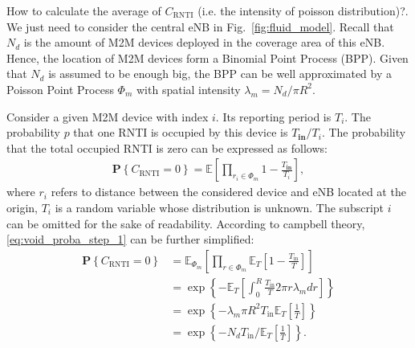 How to calculate the average of $C_{\text{RNTI}}$ (i.e. the intensity of poisson distribution)?. 
We just need to consider the central eNB in Fig.~\ref{fig:fluid_model}. Recall that $N_{d}$ is the amount of M2M devices deployed in the coverage area of this eNB. Hence, the location of M2M devices form a Binomial Point Process (BPP). Given that $N_d$ is assumed to be enough big, the BPP can be well approximated by a Poisson Point Process $\Phi_m$ with spatial intensity $\lambda_m = N_d / \pi R^2$.

Consider a given M2M device with index $i$. Its reporting period is $T_i$. The probability $p$ that one RNTI is occupied by this device is $T_{\textbf{in}}/T_i$. The probability that the total occupied RNTI is zero can be expressed as follows:
\begin{align}
	\label{eq:void_proba_step_1}
	\mathbf{P} \left\lbrace  C_{\text{RNTI}} = 0 \right\rbrace  = \mathbb{E} \left[ \prod_{r_i \in \Phi_m}^{} 1 -  \frac{T_{\textbf{in}}}{T_i} \right] ,
\end{align}
where $r_i$ refers to distance between the considered device and eNB located at the origin, $T_i$ is a random variable whose distribution is unknown. The subscript $i$ can be omitted for the sake of readability. According to campbell theory, \eqref{eq:void_proba_step_1} can be further simplified: 
\begin{align}
	\label{eq:rnti_nb_void_proba}
	\mathbf{P} \left\lbrace  C_{\text{RNTI}} = 0  \right\rbrace  &= \mathbb{E}_{\Phi_m} \left[ \prod_{r \in \Phi_m}^{} \mathbb{E}_{T} \left[ 1 - \frac{T_{\text{in}}}{T} \right] \right] \nonumber\\
	&= \exp\left\lbrace -\mathbb{E}_{T} \left[ \int_{0}^{R} \frac{T_{\text{in}}}{T} 2\pi r \lambda_m dr  \right] \right\rbrace \nonumber\\
	&= \exp\left\lbrace -\lambda_m \pi R^2  T_{\text{in}} \mathbb{E}_{T} \left[ \frac{1}{T}  \right] \right\rbrace \nonumber \\
	&= \exp\left\lbrace -N_{d} T_{\text{in}}/\mathbb{E}_T \left[ \frac{1}{T} \right]\right\rbrace. 
\end{align}

